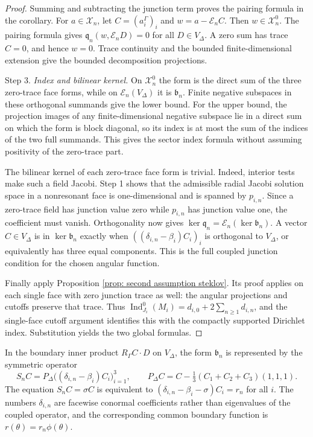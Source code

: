 \documentclass[11pt,twoside]{amsart}
\numberwithin{equation}{section}
\begin{document}
\begin{proof}
Summing and subtracting the junction term proves the pairing formula in the corollary. For $a\in\mathcal X_n$, let $C=(a_i^\Gamma)_i$ and $w=a-\mathscr E_n C$. Then $w\in\mathcal X_n^0$. The pairing formula gives $\mathfrak q_n(w,\mathscr E_n D)=0$ for all $D\in V_\Delta$. A zero sum has trace $C=0$, and hence $w=0$. Trace continuity and the bounded finite-dimensional extension give the bounded decomposition projections.

\medskip
\noindent Step 3. \emph{Index and bilinear kernel.}
On $\mathcal X_n^0$ the form is the direct sum of the three zero-trace face forms, while on $\mathscr E_n(V_\Delta)$ it is $\mathfrak b_n$. Finite negative subspaces in these orthogonal summands give the lower bound. For the upper bound, the projection images of any finite-dimensional negative subspace lie in a direct sum on which the form is block diagonal, so its index is at most the sum of the indices of the two full summands. This gives the sector index formula without assuming positivity of the zero-trace part.

The bilinear kernel of each zero-trace face form is trivial. Indeed, interior tests make such a field Jacobi. Step 1 shows that the admissible radial Jacobi solution space in a nonresonant face is one-dimensional and is spanned by $p_{i,n}$. Since a zero-trace field has junction value zero while $p_{i,n}$ has junction value one, the coefficient must vanish. Orthogonality now gives $\ker\mathfrak q_n=\mathscr E_n(\ker\mathfrak b_n)$. A vector $C\in V_\Delta$ is in $\ker\mathfrak b_n$ exactly when $((\delta_{i,n}-\beta_i)C_i)_i$ is orthogonal to $V_\Delta$, or equivalently has three equal components. This is the full coupled junction condition for the chosen angular function.

Finally apply Proposition \ref{prop: second assumption steklov}. Its proof applies on each single face with zero junction trace as well: the angular projections and cutoffs preserve that trace. Thus
$\operatorname{Ind}_{J_i}^0(M_i)=d_{i,0}+2\sum_{n\geq1}d_{i,n}$, and the single-face cutoff argument identifies this with the compactly supported Dirichlet index. Substitution yields the two global formulas.
\end{proof}

In the boundary inner product $R_\Gamma C\cdot D$ on $V_\Delta$, the form $\mathfrak b_n$ is represented by the symmetric operator
\[
S_n C=P_\Delta\bigl((\delta_{i,n}-\beta_i)C_i\bigr)_{i=1}^3,
\qquad
P_\Delta C=C-\tfrac13(C_1+C_2+C_3)(1,1,1).
\]
The equation $S_nC=\sigma C$ is equivalent to
$(\delta_{i,n}-\beta_i-\sigma)C_i=r_n$ for all $i$. The numbers $\delta_{i,n}$ are facewise conormal coefficients rather than eigenvalues of the coupled operator, and the corresponding common boundary function is $r(\theta)=r_n\phi(\theta)$.
\end{document}
